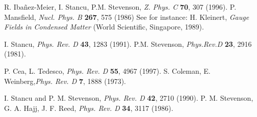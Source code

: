 \documentclass[aps,preprint]{revtex4}
\begin{document}
\begin{thebibliography}{10}
 R. Iba\~nez-Meier, I. Stancu, P.M. Stevenson, {\em Z. Phys. C} {\bf 70}, 307 (1996).
 P. Mansfield, {\em Nucl. Phys. B} {\bf 267}, 575 (1986)
 See for instance: H. Kleinert, {\it Gauge Fields in Condensed Matter}
(World Scientific, Singapore, 1989).

 I. Stancu, {\em Phys. Rev. D} {\bf 43}, 1283 (1991).
 P.M. Stevenson, {\em Phys.Rev.D} {\bf 23}, 2916 (1981).

 P. Cea, L. Tedesco, {\em Phys. Rev. D} {\bf 55}, 4967 (1997).
  S. Coleman, E. Weinberg,{\em Phys. Rev. D} {\bf 7}, 1888 (1973).

 I. Stancu and P. M. Stevenson, {\em Phys. Rev. D} {\bf 42}, 2710 (1990).
 P. M. Stevenson, G. A. Hajj, J. F. Reed, {\em Phys. Rev. D} {\bf 34}, 3117 (1986).

\end{thebibliography}
\end{document}
